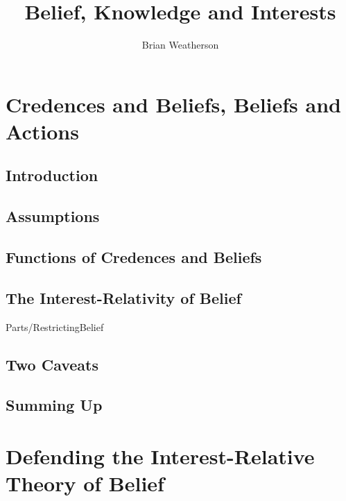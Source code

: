 \documentclass[oneside]{book}
\title{Belief, Knowledge and Interests}
\author{Brian Weatherson}
\begin{document}
\begin{titlepage}
\maketitle
\end{titlepage}

\setcounter{tocdepth}{1}

 \tableofcontents \newpage {}

\chapter{Credences and Beliefs, Beliefs and Actions}

\section{Introduction}



\section{Assumptions}



\section{Functions of Credences and Beliefs}



\section{The Interest-Relativity of Belief}

 {Parts/RestrictingBelief}

\section{Two Caveats}



\section{Summing Up}

\chapter{Defending the Interest-Relative Theory of Belief}
\end{document}
